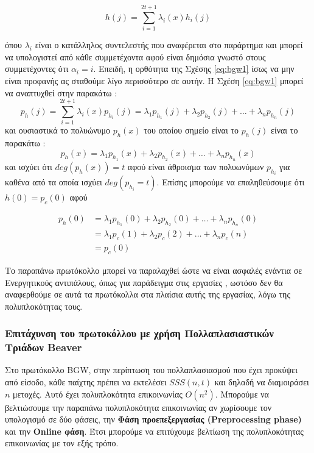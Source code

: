\begin{itemize}
\begin{itemize}
            \begin{equation}\label{eq:bgw1}
            h(j) = \sum_{i=1}^{2t+1}λ_i(x)h_i(j)
            \end{equation}
            
            όπου $λ_i$ είναι ο κατάλληλος συντελεστής που αναφέρεται στο παράρτημα  και μπορεί να υπολογιστεί από κάθε συμμετέχοντα αφού είναι δημόσια γνωστό στους συμμετέχοντες ότι $α_i=i$. Επειδή, η ορθότητα της Σχέσης \ref{eq:bgw1} ίσως να μην είναι προφανής ας σταθούμε λίγο περισσότερο σε αυτήν. Η Σχέση \ref{eq:bgw1} μπορεί να αναπτυχθεί στην παρακάτω :
            $$            
                 p_h(j) = \sum_{i=1}^{2t+1}λ_i(x)p_{h_i}(j) = λ_1p_{h_1}(j) + λ_2p_{h_2}(j) + \ldots + λ_n p_{h_n}(j)
            $$
            και ουσιαστικά το πολυώνυμο $p_h(x)$ του οποίου σημείο είναι το $p_h(j)$ είναι το παρακάτω : 
            $$
                p_h(x) = λ_1p_{h_1}(x) + λ_2p_{h_2}(x) + \ldots + λ_n p_{h_n}(x)
            $$
            και ισχύει ότι $deg(p_h(x))=t$ αφού είναι άθροισμα των πολυωνύμων $p_{h_i}$ για καθένα από τα οποία ισχύει $deg(p_{h_i} = t)$. Επίσης μπορούμε να επαληθεύσουμε ότι $h(0)=p_c(0)$ αφού
            
            \begin{align}
                p_h(0) &= λ_1 p_{h_1}(0) + λ_2 p_{h_2}(0) + \ldots + λ_n p_{h_n}(0) \\
                &= λ_1 p_c(1) + λ_2 p_c(2) + \ldots + λ_n p_c(n) \\
                &= p_c(0)
            \end{align}

        \end{itemize}
\end{itemize}

Το παραπάνω πρωτόκολλο μπορεί να παραλαχθεί ώστε να είναι ασφαλές ενάντια σε Ενεργητικούς αντιπάλους, όπως για παράδειγμα στις εργασίες , ωστόσο δεν θα αναφερθούμε σε αυτά τα πρωτόκολλα στα πλαίσια αυτής της εργασίας, λόγω της πολυπλοκότητας τους.

\subsubsection{Επιτάχυνση του πρωτοκόλλου με χρήση Πολλαπλασιαστικών Τριάδων Beaver}
Στο πρωτόκολλο BGW, στην περίπτωση του πολλαπλασιασμού που έχει προκύψει από είσοδο, κάθε παίχτης πρέπει να εκτελέσει $SSS(n,t)$ και δηλαδή να διαμοιράσει $n$ μετοχές. Αυτό έχει πολυπλοκότητα επικοινωνίας $O(n^2)$. Μπορούμε να βελτιώσουμε την παραπάνω πολυπλοκότητα επικοινωνίας αν χωρίσουμε τον υπολογισμό σε δύο φάσεις, την \textbf{Φάση προεπεξεργασίας (Preprocessing phase)} και την \textbf{Online φάση}. Έτσι μπορούμε να επιτύχουμε βελτίωση της πολυπλοκότητας επικοινωνίας με τον εξής τρόπο.

